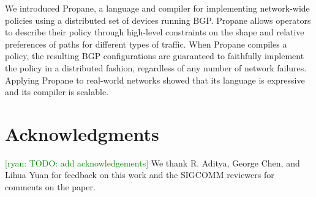 \documentclass[10pt]{sigalternate052015}
\newcommand{\ryan}[1]{\textcolor{green}{[ryan: #1]}}
\newcommand{\sysname}{{\small \sf Propane}\xspace}
\begin{document}
We introduced \sysname, a language and compiler for implementing network-wide policies using a distributed set of devices running BGP. Propane allows operators to describe their policy through high-level constraints on the shape and relative preferences of paths for different types of traffic. When \sysname compiles a policy, the resulting BGP configurations are guaranteed to faithfully implement the policy in a distributed fashion, regardless of any number of network failures. Applying \sysname to real-world networks showed that its language is expressive and its compiler is scalable.


\section*{Acknowledgments}

\ryan{TODO: add acknowledgements}
We thank R. Aditya, George Chen, and Lihua Yuan for feedback on this work and the SIGCOMM reviewers for comments on the paper.




%
%
%
%
\end{document}
